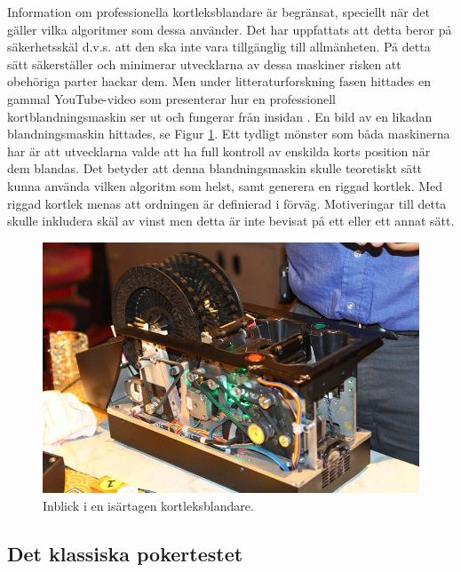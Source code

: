 \documentclass[swedish,a4paper]{article}
\begin{document}
\noindent
\begin{minipage}{0.5\textwidth}
Information om professionella kortleksblandare är 
begränsat, speciellt när det gäller vilka algoritmer som dessa
använder. Det 
har uppfattats att detta beror på säkerhetsskäl d.v.s. att den ska
inte vara tillgänglig till
allmänheten. På detta sätt säkerställer och
minimerar utvecklarna av dessa maskiner risken att
obehöriga parter hackar dem. 
Men under litteraturforskning fasen hittades en gammal YouTube-video som presenterar hur en professionell kortblandningsmaskin ser ut och
fungerar från insidan \parencite{shufflerVideo}. En bild av en likadan 
blandningsmaskin hittades, se Figur \ref{fig:casino_shuffler}. Ett 
tydligt mönster som båda maskinerna har är att utvecklarna valde att ha 
full kontroll av enskilda korts position när dem blandas. Det betyder att denna
blandningsmaskin skulle teoretiskt sätt kunna använda vilken
algoritm som helst, samt generera en riggad kortlek. Med riggad kortlek
menas att ordningen är definierad i förväg. Motiveringar till detta skulle
inkludera skäl av vinst men detta är
inte bevisat på ett eller ett annat sätt. 
\end{minipage}%
\hfill
\begin{minipage}{0.5\linewidth}
\begin{figure}[H]
    \centering
    \includegraphics[width=0.9\linewidth]{automatic_card_shuffler.jpg}
    \captionsetup{width=0.5\linewidth}
    \caption{Inblick i en isärtagen kortleksblandare.}
    \label{fig:casino_shuffler}
\end{figure}
\end{minipage}

\subsection{Det klassiska pokertestet}
\label{sec:poker_test}
\end{document}
